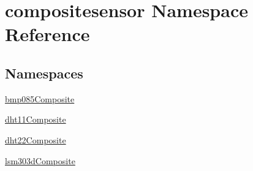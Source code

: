 \hypertarget{namespacecompositesensor}{}\section{compositesensor Namespace Reference}
\label{namespacecompositesensor}
\subsection*{Namespaces}
\begin{DoxyCompactItemize}
\item 
 \hyperlink{namespacecompositesensor_1_1bmp085Composite}{bmp085\+Composite}
\item 
 \hyperlink{namespacecompositesensor_1_1dht11Composite}{dht11\+Composite}
\item 
 \hyperlink{namespacecompositesensor_1_1dht22Composite}{dht22\+Composite}
\item 
 \hyperlink{namespacecompositesensor_1_1lsm303dComposite}{lsm303d\+Composite}
\end{DoxyCompactItemize}
